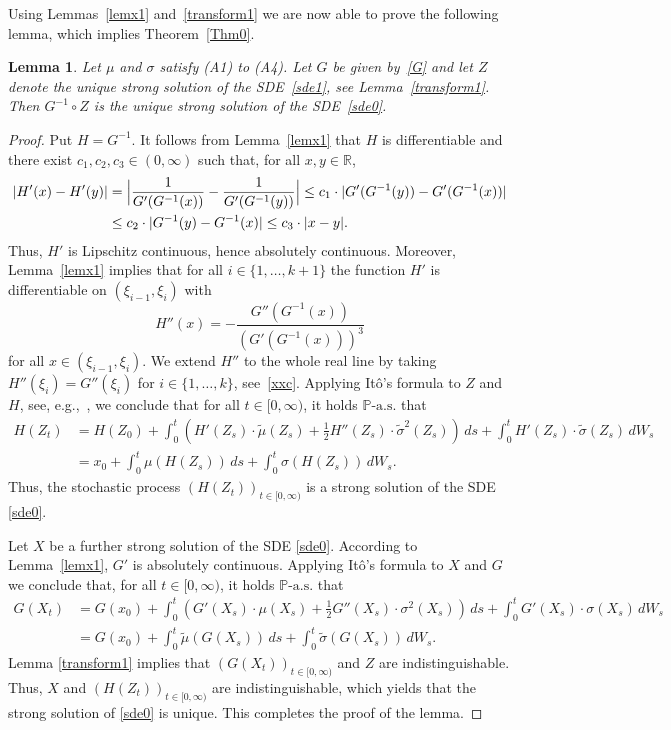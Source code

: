 \documentclass[11pt]{amsart}
\newcommand{\R}{{\mathbb R}}
\newcommand{\PP}{{\mathbb P}}
\theoremstyle{plain}
\newtheorem{lemma}{Lemma}
\theoremstyle{definition}
\begin{document}
Using Lemmas~\ref{lemx1} and~\ref{transform1} we are now able to prove the following lemma, which implies Theorem~\ref{Thm0}.

\begin{lemma}\label{transform3} Let $\mu$ and $\sigma$ satisfy (A1) to (A4). Let $G$ be given by~\eqref{G} and let $Z$ denote the unique strong solution  of the SDE~\eqref{sde1}, see Lemma~\ref{transform1}. Then $G^{-1}\circ Z$ is the unique strong solution of the SDE~\eqref{sde0}.
	\end{lemma}



\begin{proof}
Put $H=G^{-1}$.
It follows from Lemma~\ref{lemx1} that $H$ is differentiable and there exist $c_1, c_2,c_3\in(0, \infty)$ such that, for all $x,y\in\R$,
\begin{align*}
|H'(x)-H'(y)|&=\Bigl|\frac{1}{G'(G^{-1}(x))}-\frac{1}{G'(G^{-1}(y))}\Bigr|\leq c_1\cdot |G'(G^{-1}(y))-G'(G^{-1}(x))|\\
&\leq c_2\cdot |G^{-1}(y)-G^{-1}(x)|\leq c_3\cdot |x-y|.
\end{align*}
Thus, $H'$ is Lipschitz continuous, hence absolutely continuous. Moreover, Lemma~\ref{lemx1} implies that for all $i\in\{1,\dots,k+1\}$ the function $H'$ is differentiable on $(\xi_{i-1},\xi_i)$ with
\[
H''(x)=-\frac{G''(G^{-1}(x))}{(G'(G^{-1}(x)))^3}
\]
for all $x\in (\xi_{i-1},\xi_i)$.
We extend $H''$ to the whole real line by taking
$H''(\xi_i)=G''(\xi_i)$ for $i\in\{1, \ldots, k\}$, see~\eqref{xxc}.
 Applying It\^{o}'s formula to $Z$ and $H$, see, e.g.,~\cite[Problem 3.7.3]{ks91}, we conclude that for all $t\in[0,\infty)$, it holds $\PP\text{-a.s.}$ that
\begin{align*}
H(Z_t)&=H(Z_0)+\int_0^t(H'(Z_s)\cdot \widetilde\mu(Z_s)+\tfrac{1}{2}H''(Z_s)\cdot\widetilde\sigma^2(Z_s))\,ds+\int_0^t H'(Z_s)\cdot\widetilde\sigma(Z_s)\,dW_s\\
&= x_0+\int_0^t \mu(H(Z_s))\,ds +\int_0^t \sigma(H(Z_s))\,dW_s.
\end{align*}
Thus, the stochastic process $(H(Z_t))_{t\in[0,\infty)}$ is a strong solution of the SDE \eqref{sde0}.

Let $X$ be a further strong solution of the SDE \eqref{sde0}. According to Lemma~\ref{lemx1}, $G'$ is absolutely continuous.   Applying It\^{o}'s formula to $X$ and $G$ we conclude that, for all $t\in[0,\infty)$, it holds $\PP\text{-a.s.}$ that
\begin{align*}
G(X_t)&=G(x_0)+\int_0^t(G'(X_s)\cdot \mu(X_s)+\tfrac{1}{2}G''(X_s)\cdot\sigma^2(X_s))\,ds+\int_0^t G'(X_s)\cdot\sigma(X_s)\,dW_s\\
&=G(x_0)+\int_0^t \widetilde\mu(G(X_s))\,ds +\int_0^t \widetilde\sigma(G(X_s))\,dW_s.
\end{align*}
Lemma \ref{transform1} implies that  $(G(X_t))_{t\in[0,\infty)}$ and $Z$ are indistinguishable. Thus, $X$ and $(H(Z_t))_{t\in[0,\infty)}$ are indistinguishable, which yields that
  the strong solution of \eqref{sde0} is unique.
This completes the proof of the lemma.
\end{proof}
\end{document}
